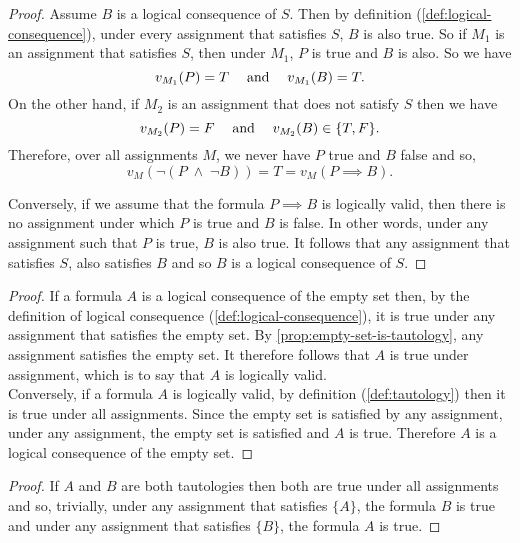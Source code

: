 \documentclass[../MathsNotesBase.tex]{subfiles}
\begin{document}
{\begin{proof}
 			Assume $B$ is a logical consequence of $S$. Then by definition (\ref{def:logical-consequence}), under every assignment that satisfies $S$, $B$ is also true. So if $M_1$ is an assignment that satisfies $S$, then under $M_1$, $P$ is true and $B$ is also. So we have
 			\[ v_{M_1}(P) = T \; \hspace{10pt}\text{and}\hspace{10pt} \; v_{M_1}(B) = T. \]
 			On the other hand, if $M_2$ is an assignment that does not satisfy $S$ then we have
 			\[ v_{M_2}(P) = F \; \hspace{10pt}\text{and}\hspace{10pt} \; v_{M_2}(B) \in \{T, F\}. \]
 			Therefore, over all assignments $M$, we never have $P$ true and $B$ false and so,
 			\[  v_M( \lnot( P \; \land \; \lnot B ) ) = T = v_M( P \implies B ). \]
 			
 			Conversely, if we assume that the formula ${ P \implies B }$ is logically valid, then there is no assignment under which $P$ is true and $B$ is false. In other words, under any assignment such that $P$ is true, $B$ is also true. It follows that any assignment that satisfies $S$, also satisfies $B$ and so $B$ is a logical consequence of $S$.
 		\end{proof}
 	
 		\bigskip
 		\begin{proof}
 			If a formula $A$ is a logical consequence of the empty set then, by the definition of logical consequence (\ref{def:logical-consequence}), it is true under any assignment that satisfies the empty set. By \autoref{prop:empty-set-is-tautology}, any assignment satisfies the empty set. It therefore follows that $A$ is true under assignment, which is to say that $A$ is logically valid.\\
 			Conversely, if a formula $A$ is logically valid, by definition (\ref{def:tautology}) then it is true under all assignments. Since the empty set is satisfied by any assignment, under any assignment, the empty set is satisfied and $A$ is true. Therefore $A$ is a logical consequence of the empty set.
 		\end{proof}
 	
 		\bigskip
 		\begin{proof} 
 			If $A$ and $B$ are both tautologies then both are true under all assignments and so, trivially, under any assignment that satisfies $\{A\}$, the formula $B$ is true and under any assignment that satisfies $\{B\}$, the formula $A$ is true.
 		\end{proof}
 		
}
\end{document}

